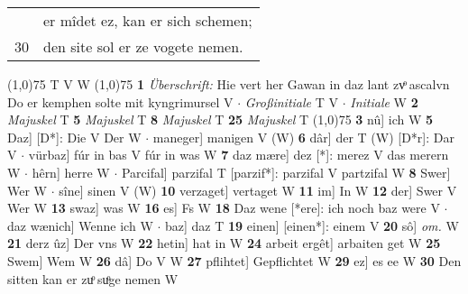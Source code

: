 \documentclass[8pt,a4paper,notitlepage]{article}
\begin{document}
\begin{table}[ht]
\begin{minipage}[t]{0.5\linewidth}
\begin{tabular}{rl}
 & er mîdet ez, kan er sich schemen;\\ 
30 & den site sol er ze vogete nemen.\\ 
\end{tabular}
\scriptsize
\line(1,0){75} \newline
T V W \newline
\line(1,0){75} \newline
\textbf{1} \textit{Überschrift:} Hie vert her Gawan in daz lant zvͦ ascalvn Do er kemphen solte mit kyngrimursel V   $\cdot$ \textit{Großinitiale} T V   $\cdot$ \textit{Initiale} W  \textbf{2} \textit{Majuskel} T  \textbf{5} \textit{Majuskel} T  \textbf{8} \textit{Majuskel} T  \textbf{25} \textit{Majuskel} T  \newline
\line(1,0){75} \newline
\textbf{3} nû] ich W \textbf{5} Daz] [D*]: Die V Der W  $\cdot$ maneger] manigen V (W) \textbf{6} dâr] der T (W) [D*r]: Dar  V  $\cdot$ vürbaz] fúr in bas V fúr in was W \textbf{7} daz mære] dez [*]: merez V das merern W  $\cdot$ hêrn] herre W  $\cdot$ Parcifal] parzifal T [parzif*]: parzifal V partzifal W \textbf{8} Swer] Wer W  $\cdot$ sîne] sinen V (W) \textbf{10} verzaget] vertaget W \textbf{11} im] In W \textbf{12} der] Swer V Wer W \textbf{13} swaz] was W \textbf{16} es] Fs W \textbf{18} Daz wene [*ere]: ich noch baz were V  $\cdot$ daz wænich] Wenne ich W  $\cdot$ baz] daz T \textbf{19} einen] [einen*]: einem V \textbf{20} sô] \textit{om.} W \textbf{21} derz ûz] Der vns W \textbf{22} hetin] hat in W \textbf{24} arbeit ergêt] arbaiten get W \textbf{25} Swem] Wem W \textbf{26} dâ] Do V W \textbf{27} pflihtet] Gepflichtet W \textbf{29} ez] es ee W \textbf{30} Den sitten kan er zuͦ suͦge nemen W \newline
\end{minipage}
\end{table}
\end{document}

